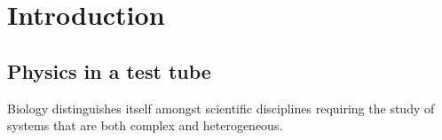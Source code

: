 \chapter{Introduction}
\setcounter{page}{1}
\label{chap:intro}

\section{Physics in a test tube}
\chapquote{}{}

\vskip 0.5cm

Biology distinguishes itself amongst scientific disciplines requiring the study of systems that are both complex and heterogeneous. 

